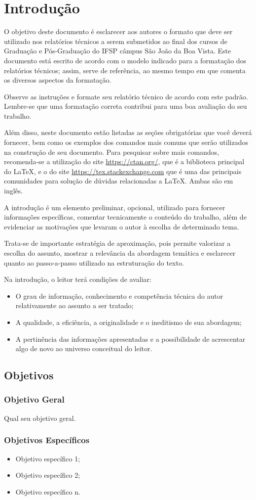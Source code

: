 \chapter{Introdução}
\label{cap:01}

O objetivo deste documento é esclarecer aos autores o formato que deve ser utilizado nos relatórios técnicos a serem submetidos ao final
dos cursos de Graduação e Pós-Graduação do IFSP câmpus São João da Boa Vista. Este documento está escrito de acordo com o modelo indicado
para a formatação dos relatórios técnicos; assim, serve de referência, ao mesmo tempo em que comenta os diversos aspectos da formatação.

Observe as instruções e formate seu relatório técnico de acordo com este padrão. Lembre-se que uma formatação correta contribui para uma boa
avaliação do seu trabalho.

Além disso, neste documento estão listadas as seções obrigatórias que você deverá fornecer, bem como os exemplos dos comandos mais comuns
que serão utilizados na construção de seu documento. Para pesquisar sobre mais comandos, recomenda-se a utilização do site \url{https://ctan.org/},
que é a biblioteca principal do \LaTeX, e o do site \url{https://tex.stackexchange.com} que é uma das principais comunidades para solução de dúvidas
relacionadas a \LaTeX. Ambas são em inglês.

A introdução é um elemento preliminar, opcional, utilizado para fornecer informações específicas, comentar tecnicamente o conteúdo do trabalho,
além de evidenciar as motivações que levaram o autor à escolha de determinado tema.

Trata-se de importante estratégia de aproximação, pois permite valorizar a escolha do assunto, mostrar a relevância da abordagem temática e
esclarecer quanto ao passo-a-passo utilizado na estruturação do texto.

Na introdução, o leitor terá condições de avaliar:

\begin{itemize}
	\item O grau de informação, conhecimento e competência técnica do autor relativamente ao assunto a ser tratado;
	\item A qualidade, a eficiência, a originalidade e o ineditismo de sua abordagem;
	\item A pertinência das informações apresentadas e a possibilidade de acrescentar algo de novo ao universo conceitual do leitor.
\end{itemize}


\section{Objetivos}

\subsection{Objetivo Geral}

Qual seu objetivo geral.

\subsection{Objetivos Específicos}
\begin{itemize}
	\item Objetivo específico 1;
	\item Objetivo específico 2;
	\item Objetivo específico n.
\end{itemize}
